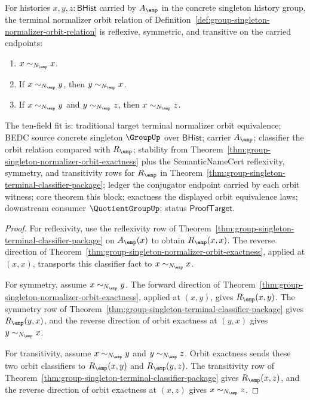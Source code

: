 \begin{theorem}
\label{thm:group-singleton-normalizer-orbit-equivalence}
For histories $x,y,z:\mathsf{BHist}$ carried by $A_{\emp}$ in the concrete
singleton history group, the terminal normalizer orbit relation of
Definition~\ref{def:group-singleton-normalizer-orbit-relation} is reflexive,
symmetric, and transitive on the carried endpoints:
\begin{enumerate}
\item $x\sim_{N_{\emp}}x$.
\item If $x\sim_{N_{\emp}}y$, then $y\sim_{N_{\emp}}x$.
\item If $x\sim_{N_{\emp}}y$ and $y\sim_{N_{\emp}}z$, then
$x\sim_{N_{\emp}}z$.
\end{enumerate}
The ten-field fit is: traditional target terminal normalizer orbit
equivalence; BEDC source concrete singleton $\GroupUp$ over $\mathsf{BHist}$;
carrier $A_{\emp}$; classifier the orbit relation compared with $R_{\emp}$;
stability from Theorem~\ref{thm:group-singleton-normalizer-orbit-exactness}
plus the SemanticNameCert reflexivity, symmetry, and transitivity rows for
$R_{\emp}$ in Theorem~\ref{thm:group-singleton-terminal-classifier-package};
ledger the conjugator endpoint carried by each orbit witness; core theorem this
block; exactness the displayed orbit equivalence laws; downstream consumer
$\QuotientGroupUp$; status $\mathsf{ProofTarget}$.
\end{theorem}
\begin{proof}
For reflexivity, use the reflexivity row of
Theorem~\ref{thm:group-singleton-terminal-classifier-package} on
$A_{\emp}(x)$ to obtain $R_{\emp}(x,x)$. The reverse direction of
Theorem~\ref{thm:group-singleton-normalizer-orbit-exactness}, applied at
$(x,x)$, transports this classifier fact to $x\sim_{N_{\emp}}x$.

For symmetry, assume $x\sim_{N_{\emp}}y$. The forward direction of
Theorem~\ref{thm:group-singleton-normalizer-orbit-exactness}, applied at
$(x,y)$, gives $R_{\emp}(x,y)$. The symmetry row of
Theorem~\ref{thm:group-singleton-terminal-classifier-package} gives
$R_{\emp}(y,x)$, and the reverse direction of orbit exactness at $(y,x)$ gives
$y\sim_{N_{\emp}}x$.

For transitivity, assume $x\sim_{N_{\emp}}y$ and $y\sim_{N_{\emp}}z$. Orbit
exactness sends these two orbit classifiers to $R_{\emp}(x,y)$ and
$R_{\emp}(y,z)$. The transitivity row of
Theorem~\ref{thm:group-singleton-terminal-classifier-package} gives
$R_{\emp}(x,z)$, and the reverse direction of orbit exactness at $(x,z)$ gives
$x\sim_{N_{\emp}}z$.
\end{proof}

